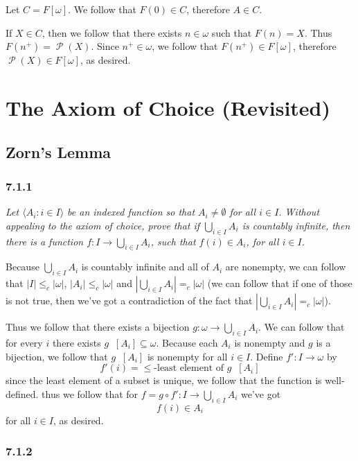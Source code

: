 \documentclass[11pt,oneside,titlepage]{book}
\DeclareMathOperator \pow {\mathcal {P}}
\DeclareMathOperator \inv {^{-1}}
\newcommand{\eangle}[1]{\langle #1 \rangle}
\begin{document}
Let $C = F[\omega]$. We follow that $F(0) \in C$, therefore $A \in C$.

If $X \in C$, then we follow that there exists $n \in \omega$ such that
$F(n) = X$. Thus $F(n^+) = \pow(X)$. Since $n^+ \in \omega$, we follow that
$F(n^+) \in F[\omega]$, therefore $\pow(X) \in F[\omega]$, as desired.

\chapter{The Axiom of Choice (Revisited)}

\section{Zorn's Lemma}

\subsection*{7.1.1}

\textit{Let $\eangle{A_i: i \in I}$ be an indexed function so that $A_i \neq \emptyset$ for
  all $i \in I$. Without appealing to the axiom of choice, prove that if $\bigcup_{i \in I}{A_i}$
  is countably infinite, then there is a function $f: I \to \bigcup_{i \in I}{A_i}$,
  such that $f(i) \in A_i$, for all $i \in I$.}

Because $\bigcup_{i \in I}{A_i}$ is countably infinite and all of $A_i$ are nonempty,
we can follow that $|I| \leq_c |\omega|$, $|A_i| \leq_c |\omega|$
and $|\bigcup_{i \in I}{A_i}| =_c |\omega|$ (we can follow that if one of those is not true,
then we've got a contradiction of the fact that $|\bigcup_{i \in I}{A_i}| =_c |\omega|$).

Thus we follow that there exists a bijection $g: \omega \to \bigcup_{i \in I}{A_i}$.
We can follow that for every $i$ there exists $g\inv[A_i] \subseteq \omega$.
Because each $A_i$ is nonempty and $g$ is a bijection, we follow that $g\inv[A_i]$ is
nonempty for all $i \in I$. Define $f': I \to \omega$ by
$$f'(i) = \text{$\leq$-least element of $g\inv[A_i]$}$$
since the least element of a subset is unique, we follow that the function is well-defined.
thus we follow that for $f = g \circ f': I \to \bigcup_{i \in I}{A_i}$ we've got
$$f(i) \in A_i$$
for all $i \in I$, as desired.

\subsection*{7.1.2}
\end{document}
